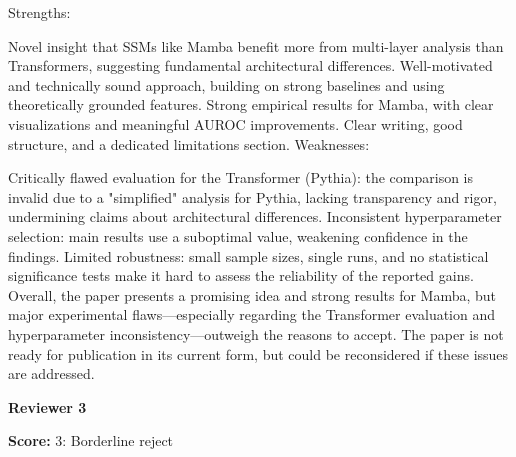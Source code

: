 \begin{tcolorbox}[
    colback=white,
    colframe=black!70,
    title=Reviewer Comments,
    breakable=true,
    fonttitle=\bfseries
]
Strengths:

Novel insight that SSMs like Mamba benefit more from multi-layer analysis than Transformers, suggesting fundamental architectural differences.
Well-motivated and technically sound approach, building on strong baselines and using theoretically grounded features.
Strong empirical results for Mamba, with clear visualizations and meaningful AUROC improvements.
Clear writing, good structure, and a dedicated limitations section.
Weaknesses:

Critically flawed evaluation for the Transformer (Pythia): the comparison is invalid due to a "simplified" analysis for Pythia, lacking transparency and rigor, undermining claims about architectural differences.
Inconsistent hyperparameter selection: main results use a suboptimal value, weakening confidence in the findings.
Limited robustness: small sample sizes, single runs, and no statistical significance tests make it hard to assess the reliability of the reported gains.
Overall, the paper presents a promising idea and strong results for Mamba, but major experimental flaws—especially regarding the Transformer evaluation and hyperparameter inconsistency—outweigh the reasons to accept. The paper is not ready for publication in its current form, but could be reconsidered if these issues are addressed.

\end{tcolorbox}

\textbf{Reviewer 3}


\begin{tcolorbox}[
    colback=gray!5,
    colframe=gray!60,
    title=Review Score,
    fonttitle=\bfseries
]
\textbf{Score:} 3: Borderline reject
\end{tcolorbox}


